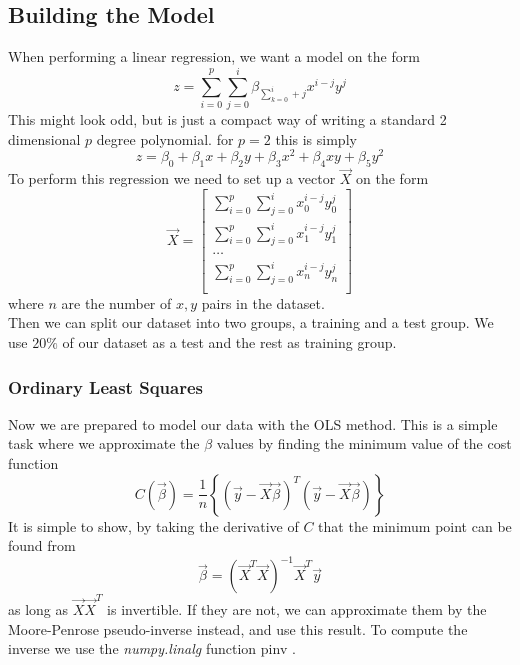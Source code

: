 \documentclass[11pt, A4paper, english]{article}
\begin{document}
\begin{multicols}{2}
			\subsection{Building the Model}
When performing a linear regression, we want a model on the form
			\begin{equation}
z = \sum_{i = 0}^{p} \sum_{j = 0}^{i} \beta_{\sum_{k = 0}^{i} + j} x^{i - j}y^{j}
			\end{equation}
This might look odd, but is just a compact way of writing a standard 2 dimensional $p$ degree polynomial. for $p = 2$ this is simply
			\begin{equation*}
z = \beta_0 + \beta_1 x + \beta_2 y + \beta_3 x^2 + \beta_4 xy + \beta_5 y^2 
			\end{equation*}
To perform this regression we need to set up a vector $\vec{X}$ on the form
			\begin{equation}
\vec{X} = \left[ \begin{matrix}
\sum_{i = 0}^{p} \sum_{j = 0}^{i} x_0^{i - j}y_0^{j} \\
\sum_{i = 0}^{p} \sum_{j = 0}^{i} x_1^{i - j}y_1^{j} \\
\dots \\
\sum_{i = 0}^{p} \sum_{j = 0}^{i} x_n^{i - j}y_n^{j} \\
\end{matrix} \right]
			\end{equation}
where $n$ are the number of $x, y$ pairs in the dataset. \\
Then we can split our dataset into two groups, a training and a test group. We use $20\%$ of our dataset as a test and the rest as training group.

				\subsubsection{Ordinary Least Squares}
Now we are prepared to model our data with the OLS method. This is a simple task where we approximate the $\beta$ values by finding the minimum value of the cost function
				\begin{equation*}
C(\vec{\beta}) =  \frac{1}{n} \left\{ \left( \vec{y} - \vec{X} \vec{\beta} \right)^{T} \left( \vec{y} - \vec{X} \vec{\beta} \right) \right\}
				\end{equation*}
It is simple to show, by taking the derivative of $C$ that the minimum point can be found from
				\begin{equation}
\vec{\beta} = \left( \vec{X}^T \vec{X} \right)^{-1} \vec{X}^T \vec{y}
				\end{equation}
as long as $\vec{X} \vec{X}^T$ is invertible. If they are not, we can approximate them by the Moore-Penrose pseudo-inverse instead, and use this result. To compute the inverse we use the \textit{numpy.linalg} function pinv \cite{Pinv}.


\end{multicols}
\end{document}
